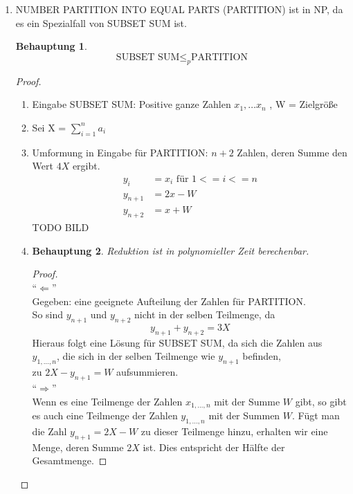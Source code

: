 \documentclass[a4paper]{scrartcl}
\newtheorem*{proposition}{Behauptung}
\begin{document}
\begin{enumerate}[label=\bfseries \arabic*.]
\begin{enumerate}
    \item %
     NUMBER PARTITION INTO EQUAL PARTS (PARTITION) ist in NP, da es ein Spezialfall von SUBSET SUM ist.
    \begin{proposition}
        \[ \text{SUBSET SUM} \leq_{p} \text{PARTITION} \]
    \end{proposition}
    \begin{proof}
        \hfill \\
        \begin{enumerate}
            \item Eingabe SUBSET SUM: Positive ganze Zahlen $x_1, \dotsc x_n$ , W = Zielgröße
            \item Sei X = $\sum_{i=1}^{n} a_i $
            \item Umformung in Eingabe für PARTITION: $n + 2$ Zahlen, deren Summe den Wert $4X$ ergibt.\\ 
            \begin{align*}
                y_i &= x_i \text{ für } 1 <= i <= n \\
                y_{n+1} &= 2x - W \\
                y_{n+2} &= x + W
            \end{align*}
            TODO BILD %

            \item
                \begin{proposition}
                Reduktion ist in polynomieller Zeit berechenbar.
                \end{proposition}
                \begin{proof}
                    \hfill \\
                    ``$\Leftarrow$'' \\
                    Gegeben: eine geeignete Aufteilung der Zahlen für PARTITION.\\
                    So sind $y_{n+1}$ und $y_{n+2}$ nicht in der selben Teilmenge, da
                    $$y_{n+1} + y_{n+2} = 3X$$
                    Hieraus folgt eine Lösung für SUBSET SUM, da sich die Zahlen aus $y_{1,\dotsc,n}$,
                    die sich in der selben Teilmenge wie $y_{n+1}$ befinden, \\
                    zu $2X - y_{n+1} = W$ aufsummieren. \\

                    ``$\Rightarrow$'' \\
                    Wenn es eine Teilmenge der Zahlen $x_{1,\dotsc,n}$ mit der Summe $W$ gibt, so gibt es auch eine Teilmenge der Zahlen $y_{1,\dotsc,n}$
                    mit der Summen $W$.
                    Fügt man die Zahl $y_{n+1} = 2X - W$ zu dieser Teilmenge hinzu, erhalten wir eine Menge, deren Summe $2X$ ist.
                    Dies entspricht der Hälfte der Gesamtmenge.



\end{proof}
\end{enumerate}
\end{proof}
\end{enumerate}
\end{enumerate}
\end{document}
